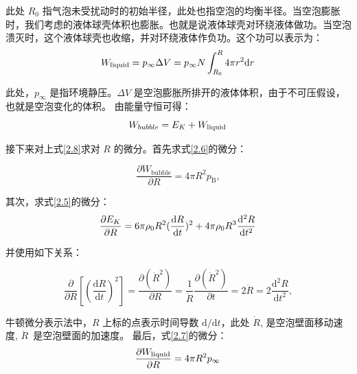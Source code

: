 此处 $R_\mathrm{0}$
指气泡未受扰动时的初始半径，此处也指空泡的均衡半径。当空泡膨胀时，我们考虑的液体球壳体积也膨胀。也就是说液体球壳对环绕液体做功。当空泡溃灭时，这个液体球壳也收缩，并对环绕液体作负功。这个功可以表示为：
\begin{equation}
W _ \mathrm{ liquid } = p _ {\infty } \Delta V = p _ { \infty } N\int _ { R_ 0 } ^ { R } 4 \pi r ^ { 2 } \mathrm d r \\\,
    \label{2.7}
\end{equation}

 此处，$p _ {\infty }$ 是指环境静压。$\Delta V$
是空泡膨胀所排开的液体体积，由于不可压假设，也就是空泡变化的体积。
由能量守恒可得：
\begin{equation}
W _ { b u b b l e } = E _ { K } + W_\mathrm{liquid}\\\,
    \label{2.8}
\end{equation}

接下来对上式\ref{2.8}求对 $R$ 的微分。首先求式\ref{2.6}的微分： 
 
\begin{equation}
\frac { \partial W _\mathrm{bu  b b l e} } { \partial R } = 4 \pi R ^ { 2 } p_\mathrm B,
    \label{2.9}
\end{equation}

其次，求式\ref{2.5}的微分： 
\begin{equation}
\frac { \partial E _ { K } } { \partial R } = 6 \pi \rho _ { 0 } R ^ { 2 } ( \frac { \mathrm d R } {  \mathrm d t } ) ^ { 2 } + 4 \pi \rho  _ { 0 } R ^ { 3 } \frac {  \mathrm d ^ { 2 } R } {  \mathrm d t ^ { 2 } }\\\,
    \label{2.10}
\end{equation}

 并使用如下关系： 

\begin{equation}
\frac { \partial } { \partial R } [ ( \frac { \mathrm d R } { \mathrm d t } ) ^ { 2 } ] = \frac { \partial ( \dot{R} ^ { 2 } ) } { \partial R } = \frac {1} {\dot{R}} \frac {\partial ( \dot{R} ^ { 2 } )} { \partial t } = 2 \ddot R = 2 \frac { \mathrm d ^ { 2 } R } { \mathrm d t ^ { 2 } },
    \label{2.11}
\end{equation}

牛顿微分表示法中，$R$ 上标的点表示时间导数
$\mathrm d / \mathrm d t$，此处 $\dot{R}$, 是空泡壁面移动速度,
$\ddot{R}\,$ 是空泡壁面的加速度。 最后，式\ref{2.7}的微分：
\begin{equation}
\frac { \partial W_\mathrm{liquid }} { \partial R } = 4 \pi R ^ { 2 } p _ { \infty } \\\,
    \label{2.12}
\end{equation}


